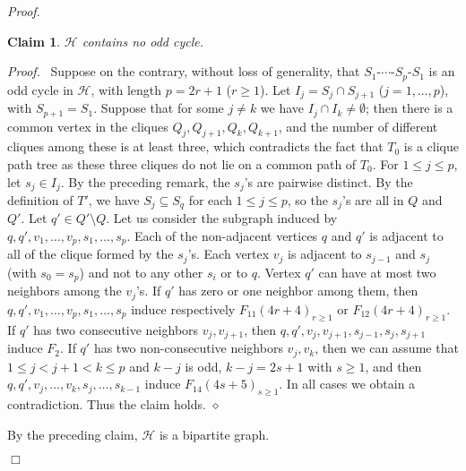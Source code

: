\documentclass[11pt]{article}
\newtheorem{claim}{Claim}
\newenvironment{proof}{\noindent \emph{Proof.}\ }{\hfill
    $\Box$\vspace{1em}}
\newenvironment{proofcl}{\noindent \emph{Proof.}\ }{Thus the claim
holds.  \hfill $\diamond$\vspace{1em}}
\begin{document}
\begin{proof}
\begin{claim}
$\mathcal H$ contains no odd cycle.
\end{claim}
\begin{proofcl}
Suppose on the contrary, without loss of generality, that
$S_1$-$\cdots$-$S_p$-$S_1$ is an odd cycle in $\mathcal H$, with
length $p=2r+1$ ($r\geq 1$).  Let $I_j= S_{j}\cap S_{j+1}$ ($j=1,
\ldots, p$), with $S_{p+1}=S_1$.  Suppose that for some $j\neq k$ we
have $I_j\cap I_k \neq \emptyset$; then there is a common vertex in
the cliques $Q_{j}, Q_{j+1}, Q_{k}, Q_{k+1}$, and the number of
different cliques among these is at least three, which contradicts the
fact that $T_0$ is a clique path tree as these three cliques do not
lie on a common path of $T_0$.  For $1\leq j\leq p$, let $s_j\in I_j$.
By the preceding remark, the $s_j$'s are pairwise distinct.  By the
definition of $T'$, we have $S_j\subseteq S_q$ for each $1\leq j\leq
p$, so the $s_j$'s are all in $Q$ and $Q'$.  Let $q'\in Q' \setminus
Q$.  Let us consider the subgraph induced by $q, q', v_1, \ldots, v_p,
s_1, \ldots, s_p$.  Each of the non-adjacent vertices $q$ and $q'$ is
adjacent to all of the clique formed by the $s_j$'s.  Each vertex
$v_j$ is adjacent to $s_{j-1}$ and $s_j$ (with $s_0=s_p$) and not to
any other $s_i$ or to $q$.  Vertex $q'$ can have at most two neighbors
among the $v_j$'s.  If $q'$ has zero or one neighbor among them, then
$q, q', v_1, \ldots, v_p, s_1, \ldots, s_p$ induce respectively
$F_{11}(4r+4)_{r\geq 1}$ or $F_{12}(4r+4)_{r\geq 1}$.  If $q'$ has two
consecutive neighbors $v_{j}, v_{j+1}$, then $q, q', v_{j}, v_{j+1},
s_{j-1}, s_{j}, s_{j+1}$ induce $F_2$.  If $q'$ has two
non-consecutive neighbors $v_{j}, v_{k}$, then we can assume that
$1\leq j<j+1<k\leq p$ and $k-j$ is odd, $k-j=2s+1$ with $s\geq 1$, and
then $q, q', v_{j}, \ldots, v_{k}, s_{j}, \ldots, s_{k-1}$ induce
$F_{14}(4s+5)_{s\geq1}$.  In all cases we obtain a contradiction.
\end{proofcl}


By the preceding claim, $\mathcal H$ is a bipartite graph.


\end{proof}
\end{document}
